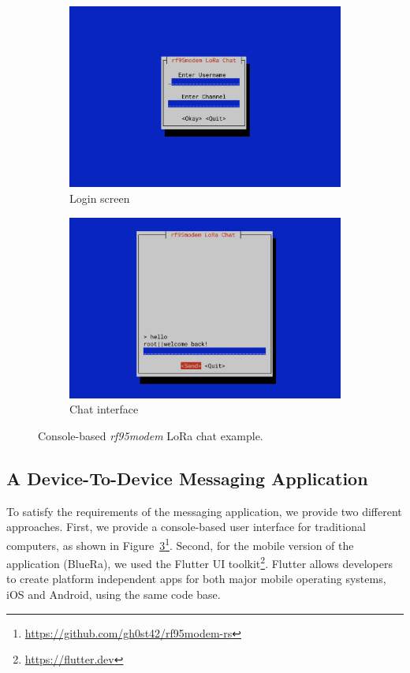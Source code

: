 \begin{figure}
\centering
\begin{subfigure}{.48\textwidth}
  \centering
  \includegraphics[width=.99\linewidth]{gfx/lorachat_1.png}
  \caption{Login screen}
  \label{hoechst2020lora:fig:lorachat:login}
\end{subfigure}%
\begin{subfigure}{.48\textwidth}
  \centering
  \includegraphics[width=.99\linewidth]{gfx/lorachat_2.png}
  \caption{Chat interface}
  \label{hoechst2020lora:fig:lorachat:chat}
\end{subfigure}
\caption{Console-based \textit{rf95modem} LoRa chat example.}
\label{hoechst2020lora:fig:lorachat}
\end{figure}


\subsection{A Device-To-Device Messaging Application}
To satisfy the requirements of the messaging application, we provide two different approaches.
First, we provide a console-based user interface for traditional computers, as shown in Figure~\ref{hoechst2020lora:fig:lorachat}\footnote{\url{https://github.com/gh0st42/rf95modem-rs}}.
Second, for the mobile version of the application (BlueRa), we used the Flutter UI toolkit\footnote{\url{https://flutter.dev}}.
Flutter allows developers to create platform independent apps for both major mobile operating systems, iOS and Android, using the same code base.

